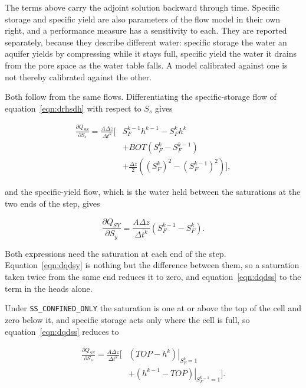 The terms above carry the adjoint solution backward through time. Specific storage and specific yield are also parameters of the flow model in their own right, and a performance measure has a sensitivity to each. They are reported separately, because they describe different water: specific storage the water an aquifer yields by compressing while it stays full, specific yield the water it drains from the pore space as the water table falls. A model calibrated against one is not thereby calibrated against the other.

Both follow from the same flows. Differentiating the specific-storage flow of equation~\ref{eqn:drhsdh} with respect to $S_s$ gives

\begin{equation}
	\label{eqn:dqdss}
	\begin{split}
	\frac{\partial Q_{SS}}{\partial S_s} = \frac{A \Delta z}{\Delta t^{k}}
	\Big[ & S_F^{k-1} h^{k-1} - S_F^{k} h^{k} \\
	& + BOT \left( S_F^{k} - S_F^{k-1} \right) \\
	& + \frac{\Delta z}{2} \left( \left(S_F^{k}\right)^{2}
	- \left(S_F^{k-1}\right)^{2} \right) \Big],
	\end{split}
\end{equation}

\noindent and the specific-yield flow, which is the water held between the saturations at the two ends of the step, gives

\begin{equation}
	\label{eqn:dqdsy}
	\frac{\partial Q_{SY}}{\partial S_y} = \frac{A \Delta z}{\Delta t^{k}}
	\left( S_F^{k-1} - S_F^{k} \right).
\end{equation}

Both expressions need the saturation at each end of the step. Equation~\ref{eqn:dqdsy} is nothing but the difference between them, so a saturation taken twice from the same end reduces it to zero, and equation~\ref{eqn:dqdss} to the term in the heads alone.

Under \texttt{SS\_CONFINED\_ONLY} the saturation is one at or above the top of the cell and zero below it, and specific storage acts only where the cell is full, so equation~\ref{eqn:dqdss} reduces to

\begin{equation}
	\label{eqn:dqdss-confined}
	\begin{split}
	\frac{\partial Q_{SS}}{\partial S_s} = \frac{A \Delta z}{\Delta t^{k}}
	\Big[ & \left. \left( TOP - h^{k} \right) \right|_{S_F^{k} = 1} \\
	& + \left. \left( h^{k-1} - TOP \right) \right|_{S_F^{k-1} = 1} \Big].
	\end{split}
\end{equation}

